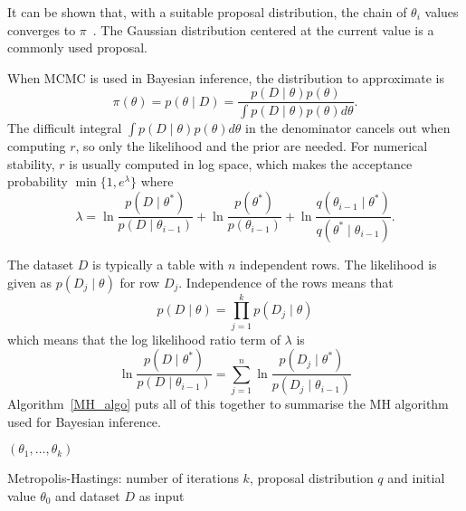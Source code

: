 \documentclass[english,twoside,openright]{HYgraduMLDS}
\begin{document}
It can be shown that, with a suitable proposal distribution, the chain of 
\(\theta_i\) values converges to \(\pi\)~\cite{BDA}. The Gaussian distribution centered 
at the current value is a commonly used proposal.

When MCMC is used in Bayesian inference, the distribution to approximate is 
\[
    \pi(\theta) = p(\theta \mid D) = \frac{p(D \mid \theta)p(\theta)}
    {\int p(D\mid \theta)p(\theta)d\theta}.
\]
The difficult integral \(\int p(D\mid \theta)p(\theta)d\theta\) in the denominator 
cancels out when computing \(r\), so only the likelihood and the prior are needed. 
For numerical stability, \(r\) is usually computed in 
log space, which makes the acceptance probability \(\min\{1, e^\lambda\}\)
where 
\[
    \lambda = \ln \frac{p(D\mid \theta^*)}{p(D\mid \theta_{i-1})}
    + \ln \frac{p(\theta^*)}{p(\theta_{i-1})}
    + \ln \frac{q(\theta_{i-1}\mid \theta^*)}{q(\theta^*\mid \theta_{i-1})}.
\]

The dataset \(D\) is typically a table with \(n\) independent rows.
The likelihood is given as \(p(D_j\mid \theta)\)
for row \(D_j\). Independence of the rows means that 
\[
    p(D\mid \theta) = \prod_{j=1}^k p(D_j\mid \theta)
\]
which means that the log likelihood ratio term of \(\lambda\) is 
\[
    \ln \frac{p(D\mid \theta^*)}{p(D\mid \theta_{i-1})}
    = \sum_{j=1}^n \ln\frac{p(D_j\mid \theta^*)}{p(D_j\mid \theta_{i-1})}
\]
Algorithm~\ref{MH_algo} puts all of this together to summarise the MH 
algorithm used for Bayesian inference.

\begin{algorithm}[H]\label{MH_algo}
    \SetAlgoLined
    \Return \((\theta_1, \dotsc, \theta_k)\)
    \caption{
        Metropolis-Hastings: number of iterations \(k\), proposal 
        distribution \(q\) and initial value \(\theta_0\) and 
        dataset \(D\) as input
    }
\end{algorithm}
\end{document}
